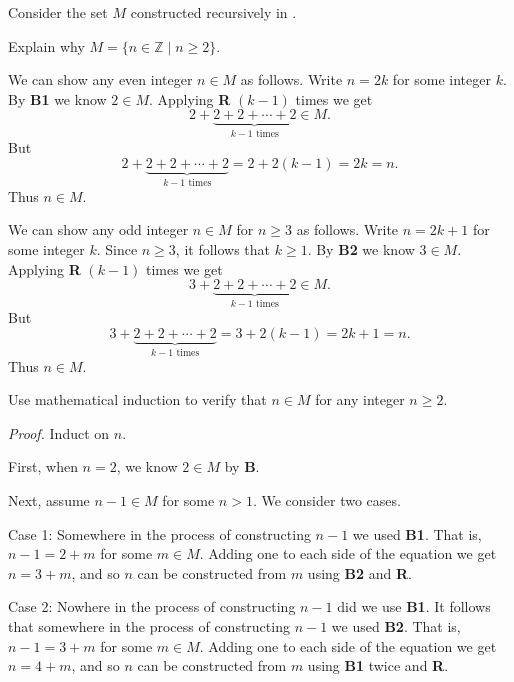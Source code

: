 \begin{exam}
\label{exam_coins_2and3}
    Consider the set $M$ constructed recursively in .
        \begin{apart}
            \item Explain why $M = \{n \in \mathbb{Z} \mid n \ge 2\}$.
                \begin{soln}
                    We can show any even integer $n \in M$ as follows. Write $n = 2k$ for some integer $k$. By \textbf{B1} we know $2 \in M$. Applying \textbf{R} $(k-1)$ times we get $$ 2 + \underbrace{2+2+\cdots +2}_{k-1 \text{ times}} \in M.$$
                    But $$2 + \underbrace{2+2+\cdots +2}_{k-1 \text{ times}} = 2+ 2(k-1) = 2k =n.$$ Thus $n \in M$.

                    We can show any odd integer $n \in M$ for $n \ge 3$ as follows.  Write $n = 2k+1$ for some integer $k$. Since $n \ge 3$, it follows that $k \ge 1$.  By \textbf{B2} we know $3 \in M$. Applying \textbf{R} $(k-1)$ times we get $$ 3 + \underbrace{2+2+\cdots +2}_{k-1 \text{ times}} \in M.$$
                    But $$3 + \underbrace{2+2+\cdots +2}_{k-1 \text{ times}} = 3 + 2(k-1) = 2k + 1=n.$$ Thus $n \in M$.
                \end{soln}
            \item \label{part_math_ind_coins_2and3} Use mathematical induction to verify that $n \in M$ for any integer $n \ge 2$.
                \begin{soln}
                    \emph{Proof.}  Induct on $n$.  

                    First, when $n = 2$, we know $2 \in M$ by \textbf{B}.

                    Next, assume $n-1 \in M$ for some $n >1$.  We consider two cases.

                    Case 1: Somewhere in the process of constructing $n-1$ we used \textbf{B1}.  That is, $n-1=2+m$ for some $m \in M$.  Adding one to each side of the equation we get $n = 3 + m$, and so $n$ can be constructed from $m$ using \textbf{B2} and \textbf{R}.

                    Case 2: Nowhere in the process of constructing $n-1$ did we use \textbf{B1}.  It follows that somewhere in the process of constructing $n-1$ we used \textbf{B2}. That is, $n-1 = 3+m$ for some $m \in M$.  Adding one to each side of the equation we get $n = 4 + m$, and so $n$ can be constructed from $m$ using \textbf{B1} twice and \textbf{R}. 
                \end{soln}
        \end{apart}
\end{exam}

